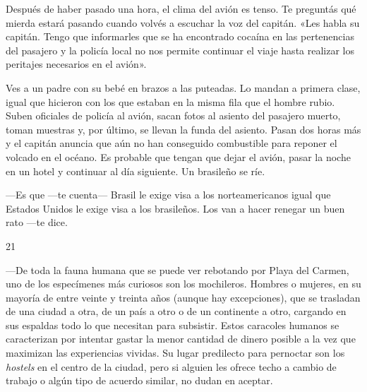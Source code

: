 \documentclass[12pt,twoside,openright,a5paper]{book}
\begin{document}
Después de haber pasado una hora, el clima del avión es tenso. 
Te preguntás qué mierda
estará pasando cuando volvés a escuchar la voz del capitán. 
«Les habla
su capitán. Tengo que informarles que se ha encontrado cocaína en las
pertenencias del pasajero y la policía local no nos permite continuar el
viaje hasta realizar los peritajes necesarios en el avión».

Ves a un padre
con su bebé en brazos a las puteadas. Lo mandan a primera clase, igual que
hicieron con los que estaban en la misma fila que el hombre rubio. Suben
oficiales de policía al avión, sacan fotos al asiento del pasajero muerto,
toman muestras y, por último, se llevan la funda del asiento. Pasan dos
horas más y el capitán anuncia que aún no han conseguido combustible para
reponer el volcado en el océano. Es probable que tengan que dejar el avión,
pasar la noche en un hotel y continuar al día siguiente. Un brasileño se
ríe. 

---Es que ---te cuenta--- Brasil le exige visa a los norteamericanos igual
que Estados Unidos le exige visa a los brasileños. Los van a hacer renegar
un buen rato ---te dice.

\vspace{0.5cm}

\hrulefill \hspace{0.1cm}\decofourleft\hspace{0.2cm} 21 \hspace{0.2cm}\decofourright \hspace{0.1cm}\hrulefill

\nopagebreak

\vspace{0.5cm}

\nopagebreak

---De toda la fauna humana que se puede ver rebotando por Playa del Carmen, uno
de los especímenes más curiosos son los mochileros. Hombres o mujeres,
en su mayoría de entre veinte y treinta años (aunque hay excepciones), que se
trasladan de una ciudad a otra, de un país a otro o de un continente a
otro, cargando en sus espaldas todo lo que necesitan para subsistir. Estos
caracoles humanos se caracterizan por intentar gastar la menor cantidad de
dinero posible a la vez que maximizan las experiencias vividas. Su lugar
predilecto para pernoctar son los \emph{hostels} en el centro de la ciudad, pero
si alguien les ofrece techo a cambio de trabajo o algún tipo de acuerdo
similar, no dudan en aceptar.
\end{document}
